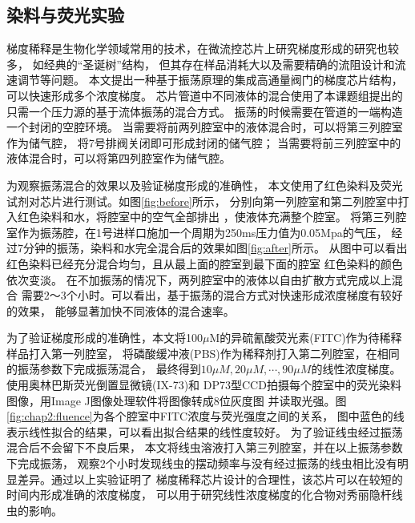 \subsection{染料与荧光实验}
	梯度稀释是生物化学领域常用的技术，在微流控芯片上研究梯度形成的研究也较多，
	如经典的“圣诞树”结构\cite{Dertinger2001Generation,Jeon2000Generation}，
	但其存在样品消耗大以及需要精确的流阻设计和流速调节等问题。
	本文提出一种基于振荡原理的集成高通量阀门的梯度芯片结构，可以快速形成多个浓度梯度。
	芯片管道中不同液体的混合使用了本课题组提出的只需一个压力源的基于流体振荡的混合方式\cite{cheng2018simple}。
	振荡的时候需要在管道的一端构造一个封闭的空腔环境。
	当需要将前两列腔室中的液体混合时，可以将第三列腔室作为储气腔，
	将7号排阀关闭即可形成封闭的储气腔；
	当需要将前三列腔室中的液体混合时，可以将第四列腔室作为储气腔。

	为观察振荡混合的效果以及验证梯度形成的准确性，
	本文使用了红色染料及荧光试剂对芯片进行测试。如图\ref{fig:before}所示，
	分别向第一列腔室和第二列腔室中打入红色染料和水，将腔室中的空气全部排出
	，使液体充满整个腔室。
	将第三列腔室作为振荡腔，在1号进样口施加一个周期为250ms压力值为0.05Mpa的气压，
	经过7分钟的振荡，染料和水完全混合后的效果如图\ref{fig:after}所示。
	从图中可以看出红色染料已经充分混合均匀，且从最上面的腔室到最下面的腔室
	红色染料的颜色依次变淡。
	在不加振荡的情况下，两列腔室中的液体以自由扩散方式完成以上混合
	需要2～3个小时。可以看出，基于振荡的混合方式对快速形成浓度梯度有较好的效果，
	能够显著加快不同液体的混合速率。
	
	为了验证梯度形成的准确性，本文将100$\mu$M的异硫氰酸荧光素(FITC)作为待稀释样品打入第一列腔室，
	将磷酸缓冲液(PBS)作为稀释剂打入第二列腔室，在相同的振荡参数下完成振荡混合，
	最终得到$10\mu M,20\mu M,\cdots,90\mu M$的线性浓度梯度。使用奥林巴斯荧光倒置显微镜(IX-73)和
	DP73型CCD拍摄每个腔室中的荧光染料图像，用Image J图像处理软件将图像转成8位灰度图
	并读取光强。图\ref{fig:chap2:fluence}为各个腔室中FITC浓度与荧光强度之间的关系，
	图中蓝色的线表示线性拟合的结果，可以看出拟合结果的线性度较好。
	为了验证线虫经过振荡混合后不会留下不良后果，
	本文将线虫溶液打入第三列腔室，并在以上振荡参数下完成振荡，
	观察2个小时发现线虫的摆动频率与没有经过振荡的线虫相比没有明显差异。通过以上实验证明了
	梯度稀释芯片设计的合理性，该芯片可以在较短的时间内形成准确的浓度梯度，
	可以用于研究线性浓度梯度的化合物对秀丽隐杆线虫的影响。

